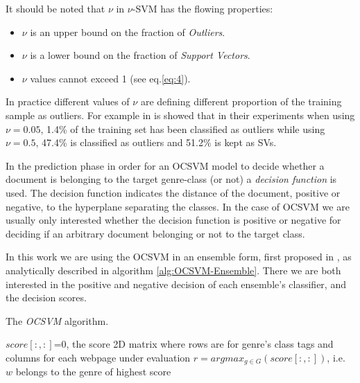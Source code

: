 \newpage


It should be noted that $\nu$ in $\nu$-SVM has the flowing properties:
\begin{itemize}
	\item $\nu$ is an upper bound on the fraction of \textit{Outliers}.
	\item $\nu$ is a lower bound on the fraction of \textit{Support Vectors}.
	\item $\nu$ values cannot exceed 1 (see eq.\ref{eq:4}).
\end{itemize}

In practice different values of $\nu$ are defining different proportion of the training sample as outliers. For example in  is showed that in their experiments when using $\nu=0.05$, 1.4\% of the training set has been classified as outliers while using $\nu=0.5$, 47.4\% is classified as outliers and 51.2\% is kept as SVs.

In the prediction phase in order for an OCSVM model to decide whether a document is belonging to the target genre-class (or not) a \textit{decision function} is used. The decision function indicates the distance of the document, positive or negative, to the hyperplane separating the classes. In the case of OCSVM we are usually only interested whether the decision function is positive or negative for deciding if an arbitrary document belonging or not to the target class.

In this work we are using the OCSVM in an ensemble form, first proposed in , as analytically described in algorithm \ref{alg:OCSVM-Ensemble}. There we are both interested in the positive and negative decision of each ensemble's classifier, and the decision scores.

\hfill \break

\begin{algorithm}[H]
\caption{The \textit{OCSVM} algorithm.}\label{alg:OCSVM-Ensemble}
$score[:, :]$=0, the score 2D matrix where rows are for genre's class tags and columns for each webpage under evaluation
{
        $r = argmax_{g \in G}(score[:, :])$, i.e. $w$ belongs to the genre of highest score\;
    }
\end{algorithm}

